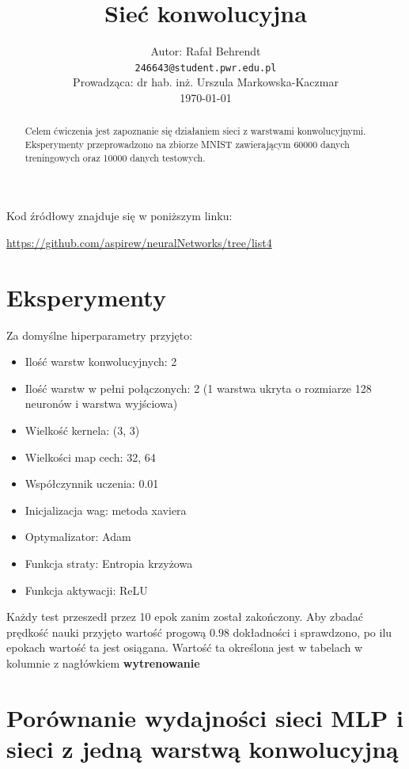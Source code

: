 \documentclass{article}
\title{ Sieć konwolucyjna  }
\author{
  Autor: Rafał Behrendt \\
  \texttt{246643@student.pwr.edu.pl} \\
  Prowadząca: dr hab. inż. Urszula Markowska-Kaczmar \\
  \today
}
\begin{document}
\maketitle

\begin{abstract}
  Celem ćwiczenia jest zapoznanie się działaniem sieci z warstwami konwolucyjnymi. Eksperymenty przeprowadzono na zbiorze
  MNIST zawierającym 60000 danych treningowych oraz 10000 danych testowych.
\end{abstract}

Kod źródłowy znajduje się w poniższym linku:

\begin{center}
  \url{https://github.com/aspirew/neuralNetworks/tree/list4}
\end{center}

\newpage
\section{Eksperymenty}

Za domyślne hiperparametry przyjęto:

\begin{itemize}
  \item Ilość warstw konwolucyjnych: 2
  \item Ilość warstw w pełni połączonych: 2 (1 warstwa ukryta o rozmiarze 128 neuronów i warstwa wyjściowa)
  \item Wielkość kernela: (3, 3)
  \item Wielkości map cech: 32, 64
  \item Współczynnik uczenia: 0.01
  \item Inicjalizacja wag: metoda xaviera
  \item Optymalizator: Adam
  \item Funkcja straty: Entropia krzyżowa
  \item Funkcja aktywacji: ReLU
\end{itemize}

Każdy test przeszedł przez 10 epok zanim został zakończony.
Aby zbadać prędkość nauki przyjęto wartość progową $0.98$ dokładności i sprawdzono, po ilu epokach wartość ta jest osiągana.
Wartość ta określona jest w tabelach w kolumnie z nagłówkiem \textbf{wytrenowanie}

\section{Porównanie wydajności sieci MLP i sieci z jedną warstwą konwolucyjną}
\end{document}
